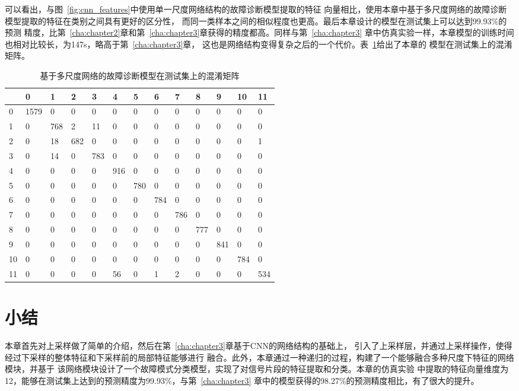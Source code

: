 可以看出，与图~\ref{fig:cnn_features}中使用单一尺度网络结构的故障诊断模型提取的特征
向量相比，使用本章中基于多尺度网络的故障诊断模型提取的特征在类别之间具有更好的区分性，
而同一类样本之间的相似程度也更高。最后本章设计的模型在测试集上可以达到99.93\%的预测
精度，比第~\ref{cha:chapter2}章和第~\ref{cha:chapter3}章获得的精度都高。同样与第~\ref{cha:chapter3}
章中仿真实验一样，本章模型的训练时间也相对比较长，为147s，略高于第~\ref{cha:chapter3}章，
这也是网络结构变得复杂之后的一个代价。表~\ref{tab:chap4:confusion_matrix}给出了本章的
模型在测试集上的混淆矩阵。
\begin{table}[htb]
  \centering
  \begin{minipage}[t]{0.9\linewidth} %
  \caption{基于多尺度网络的故障诊断模型在测试集上的混淆矩阵}
  \label{tab:chap4:confusion_matrix}
    \begin{tabularx}{\linewidth}{l|XXXXXXXXXXXX}
      \toprule[1.5pt]
         &    0 &   1 &   2 &   3 &   4 &   5 &   6 &   7 &   8 &   9 &  10 &  11 \\\midrule[1pt]
      0  & 1579 &   0 &   0 &   0 &   0 &   0 &   0 &   0 &   0 &   0 &   0 &   0 \\
      1  &    0 & 768 &   2 &  11 &   0 &   0 &   0 &   0 &   0 &   0 &   0 &   0 \\
      2  &    0 &  18 & 682 &   0 &   0 &   0 &   0 &   0 &   0 &   0 &   0 &   1 \\
      3  &    0 &  14 &   0 & 783 &   0 &   0 &   0 &   0 &   0 &   0 &   0 &   0 \\
      4  &    0 &   0 &   0 &   0 & 916 &   0 &   0 &   0 &   0 &   0 &   0 &   0 \\
      5  &    0 &   0 &   0 &   0 &   0 & 780 &   0 &   0 &   0 &   0 &   0 &   0 \\
      6  &    0 &   0 &   0 &   0 &   0 &   0 & 784 &   0 &   0 &   0 &   0 &   0 \\
      7  &    0 &   0 &   0 &   0 &   0 &   0 &   0 & 786 &   0 &   0 &   0 &   0 \\
      8  &    0 &   0 &   0 &   0 &   0 &   0 &   0 &   0 & 777 &   0 &   0 &   0 \\
      9  &    0 &   0 &   0 &   0 &   0 &   0 &   0 &   0 &   0 & 841 &   0 &   0 \\
      10 &    0 &   0 &   0 &   0 &   0 &   0 &   0 &   0 &   0 &   0 & 784 &   0 \\
      11 &    0 &   0 &   0 &   0 &  56 &   0 &   1 &   2 &   0 &   0 &   0 & 534 \\
      \bottomrule[1.5pt]
    \end{tabularx}
  \end{minipage}
\end{table}

\section{小结}

本章首先对上采样做了简单的介绍，然后在第~\ref{cha:chapter3}章基于CNN的网络结构的基础上，
引入了上采样层，并通过上采样操作，使得经过下采样的整体特征和下采样前的局部特征能够进行
融合。此外，本章通过一种递归的过程，构建了一个能够融合多种尺度下特征的网络模块，并基于
该网络模块设计了一个故障模式分类模型，实现了对信号片段的特征提取和分类。本章的仿真实验
中提取的特征向量维度为12，能够在测试集上达到的预测精度为99.93\%，与第~\ref{cha:chapter3}
章中的模型获得的98.27\%的预测精度相比，有了很大的提升。

